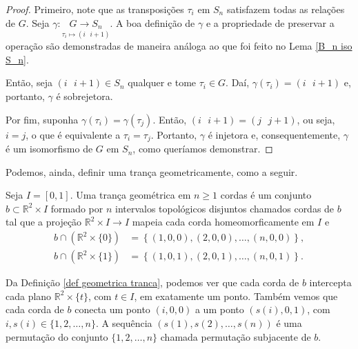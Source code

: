 	\begin{proof}
		Primeiro, note que as transposições $\tau_i$ em $S_n$ satisfazem todas as relações de $G$. 
		Seja $\gamma:\underset{\tau_i\mapsto (i\text{ }i+1)}{G\to S_n}$. A boa definição de $\gamma$ e 
		a propriedade de preservar a operação são demonstradas de maneira análoga ao que foi feito no 
		Lema \ref{B_n iso S_n}.
		
		\par\vspace{0.3cm} Então, seja $(i\text{ }i+1)\in S_n$ qualquer e tome $\tau_i\in G$. Daí, 
		$\gamma(\tau_i) = (i\text{ }i+1)$ e, portanto, $\gamma$ é sobrejetora.
		
		\par\vspace{0.3cm} Por fim, suponha $\gamma(\tau_i) = \gamma(\tau_j)$. Então, $(i\text{ }i+1) 
		= (j\text{ }j+1)$, ou seja, $i = j$, o que é equivalente a $\tau_i = \tau_j$. Portanto, $\gamma$ é 
		injetora e, consequentemente, $\gamma$ é um isomorfismo de $G$ em $S_n$, como queríamos demonstrar.
	\end{proof}
	Podemos, ainda, definir uma trança geometricamente, como a seguir.
	\begin{definition}
	\label{def geometrica tranca}
		Seja $I = [0,1]$. Uma trança geométrica em $n\geq 1$ cordas é um conjunto 
		$b\subset\mathbb{R}^2\times I$ formado por $n$ intervalos topológicos disjuntos chamados cordas 
		de $b$ tal que a projeção $\mathbb{R}^2\times I\to I$ mapeia cada corda homeomorficamente em $I$ e 
		\begin{align*}
    		b\cap (\mathbb{R}^2\times \{ 0 \}) &= \left\{ (1,0,0), (2,0,0), \dots, (n,0,0) \right\}, \\
    		b\cap (\mathbb{R}^2\times \{ 1 \}) &= \left\{ (1,0,1), (2,0,1), \dots, (n,0,1) \right\}.
		\end{align*}
	\end{definition}
	Da Definição \ref{def geometrica tranca}, podemos ver que cada corda de $b$ 
	intercepta cada plano $\mathbb{R}^2\times\{t\}$, com $t\in I$, em exatamente um ponto. Também vemos 
	que cada corda de $b$ conecta um ponto $(i,0,0)$ a um ponto $(s(i), 0, 1)$, com $i,s(i)\in \{1, 2, \dots, n\}$.
	A sequência $(s(1), s(2), \dots, s(n))$ é uma permutação do conjunto $\{1, 2, \dots, n\}$ chamada permutação
	subjacente de $b$.
